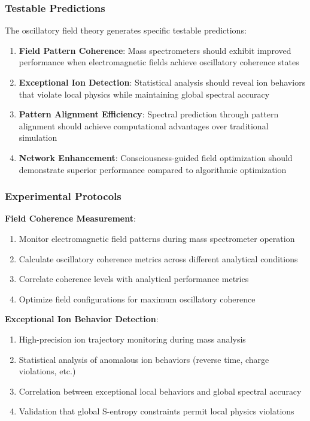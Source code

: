 \documentclass[11pt,a4paper]{article}
\theoremstyle{remark}
\begin{document}
\subsubsection{Testable Predictions}

The oscillatory field theory generates specific testable predictions:

\begin{enumerate}
\item \textbf{Field Pattern Coherence}: Mass spectrometers should exhibit improved performance when electromagnetic fields achieve oscillatory coherence states
\item \textbf{Exceptional Ion Detection}: Statistical analysis should reveal ion behaviors that violate local physics while maintaining global spectral accuracy
\item \textbf{Pattern Alignment Efficiency}: Spectral prediction through pattern alignment should achieve computational advantages over traditional simulation
\item \textbf{Network Enhancement}: Consciousness-guided field optimization should demonstrate superior performance compared to algorithmic optimization
\end{enumerate}

\subsubsection{Experimental Protocols}

\textbf{Field Coherence Measurement}:
\begin{enumerate}
\item Monitor electromagnetic field patterns during mass spectrometer operation
\item Calculate oscillatory coherence metrics across different analytical conditions
\item Correlate coherence levels with analytical performance metrics
\item Optimize field configurations for maximum oscillatory coherence
\end{enumerate}

\textbf{Exceptional Ion Behavior Detection}:
\begin{enumerate}
\item High-precision ion trajectory monitoring during mass analysis
\item Statistical analysis of anomalous ion behaviors (reverse time, charge violations, etc.)
\item Correlation between exceptional local behaviors and global spectral accuracy
\item Validation that global S-entropy constraints permit local physics violations
\end{enumerate}
\end{document}
